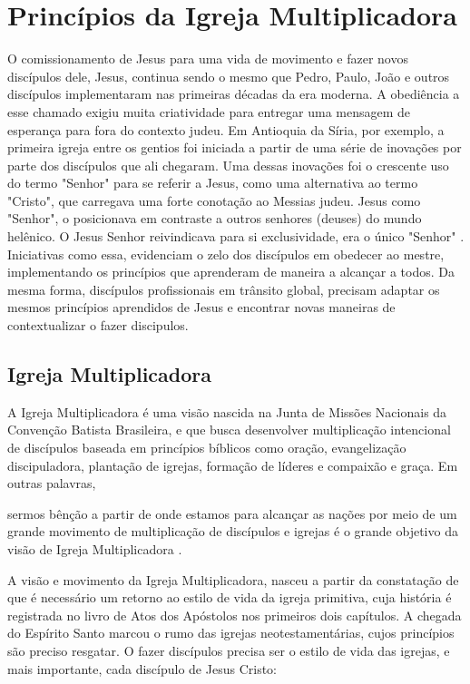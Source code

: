 \documentclass[12pt,openright,oneside,a4paper,
english,french,spanish,brazil]{abntex2}
\begin{document}
\chapter{Princípios da Igreja Multiplicadora}

O comissionamento de Jesus para uma vida de movimento e fazer novos discípulos dele, Jesus, continua sendo o mesmo que Pedro, Paulo, João e outros discípulos implementaram nas primeiras décadas da era moderna. A obediência a esse chamado exigiu muita criatividade para entregar uma mensagem de esperança para fora do contexto judeu. Em Antioquia da Síria, por exemplo, a primeira igreja entre os gentios foi iniciada a partir de uma série de inovações por parte dos discípulos que ali chegaram. Uma dessas inovações foi o crescente uso do termo "Senhor" para se referir a Jesus, como uma alternativa ao termo "Cristo", que carregava uma forte conotação ao Messias judeu. Jesus como "Senhor", o posicionava em contraste a outros senhores (deuses) do mundo helênico. O Jesus Senhor reivindicava para si exclusividade, era o único "Senhor" \cite[p. 170]{green}. Iniciativas como essa, evidenciam o zelo dos discípulos em obedecer ao mestre, implementando os princípios que aprenderam de maneira a alcançar a todos. Da mesma forma, discípulos profissionais em trânsito global, precisam adaptar os mesmos princípios aprendidos de Jesus e encontrar novas maneiras de contextualizar o fazer discipulos.

\section{Igreja Multiplicadora}

A Igreja Multiplicadora é uma visão nascida na Junta de Missões Nacionais da Convenção Batista Brasileira, e que busca desenvolver multiplicação intencional de discípulos baseada em princípios bíblicos como oração, evangelização discipuladora, plantação de igrejas, formação de líderes e compaixão e graça. Em outras palavras, 

\begin{citacao}sermos bênção a partir de onde estamos para alcançar as nações por meio de um grande movimento de multiplicação de discípulos e igrejas é o grande objetivo da visão de Igreja Multiplicadora \cite[p. 19]{freitas}.\end{citacao}

A visão e movimento da Igreja Multiplicadora, nasceu a partir da constatação de que é necessário um retorno ao estilo de vida da igreja primitiva, cuja história é registrada no livro de Atos dos Apóstolos nos primeiros dois capítulos. A chegada do Espírito Santo marcou o rumo das igrejas neotestamentárias, cujos princípios são preciso resgatar. O fazer discípulos precisa ser o estilo de vida das igrejas, e mais importante, cada discípulo de Jesus Cristo: 
\end{document}
